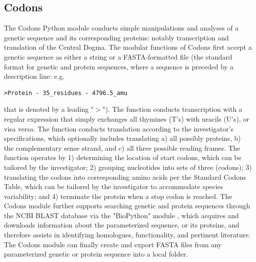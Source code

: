\subsection{Codons}
The Codons Python module conducts simple manipulations and analyses of a genetic sequence and its corresponding proteins: notably transcription and translation of the Central Dogma. The modular functions of Codons first accept a genetic sequence as either a string or a FASTA-formatted file \cite{Lipman1985RapidSearches} (the standard format for genetic and protein sequences, where a sequence is preceded by a description line: e.g. 
\begin{lstlisting}[label = fasta_protein]
>Protein - 35_residues - 4796.5_amu
\end{lstlisting}
that is denoted by a leading "$>$"). The  function conducts transcription with a regular expression \cite{Thompson1968ProgrammingAlgorithm} that simply exchanges all thymines (T's) with uracils (U's), or visa versa. The  function conducts translation according to the investigator's specifications, which optionally includes translating a) all possibly proteins, b) the complementary sense strand, and c) all three possible reading frames. The function operates by 1) determining the location of start codons, which can be tailored by the investigator; 2) grouping nucleotides into sets of three (codons); 3) translating the codons into corresponding amino acids per the Standard Codons Table, which can be tailored by the investigator to accommodate species variability; and 4) terminate the protein when a stop codon is reached. The Codons module further supports searching genetic and protein sequences through the NCBI BLAST database \cite{Johnson2008NCBIInterface.,Price2019CuratedGenomes} via the "BioPython" module \cite{Cock2009Biopython:Bioinformatics}, which acquires and downloads information about the parameterized sequence, or its proteins, and therefore assists in identifying homologues, functionality, and pertinent literature. The Codons module can finally create and export FASTA files from any parameterized genetic or protein sequence into a local folder. 

